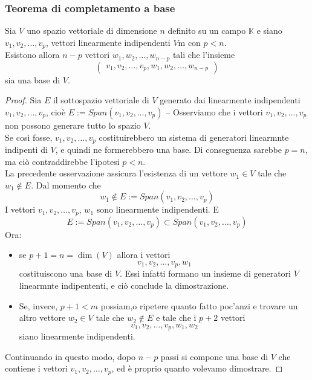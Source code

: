 \subsubsection{Teorema di completamento a base}
\label{sssec:teodicomabase}
\begin{teorema}
  Sia $V$ uno spazio vettoriale di dimensione $n$ definito su un campo $\mathbb{K}$ e siano $v_1,v_2,\dots,v_p$,
  vettori linearmente indipendenti $V$m con $p<n$.\\
  Esistono allora $n-p$ vettori $w_1,w_2,\dots,w_{n-p}$ tali che l'insieme
  \begin{equation*}
    \begin{pmatrix}
      v_1,v_2,\dots,v_p,w_1,w_2,\dots,w_{n-p}
    \end{pmatrix}
  \end{equation*}
  sia una base di $V$.
\end{teorema}
\begin{proof}
  Sia $E$ il sottospazio vettoriale di $V$ generato dai linearmente indipendenti $v_1,v_2,\dots,v_p$, cioè
  $E:=Span(v_1,v_2,\dots,v_p)$ -- Osserviamo che i vettori $v_1,v_2,\dots,v_p$ non possono generare tutto lo
  spazio $V$.\\
  Se così fosse, $v_1,v_2,\dots,v_p$ costituirebbero un sistema di generatori linearmnte indipenti di $V$, e
  quindi ne formerebbero una base. Di conseguenza sarebbe $p=n$, ma ciò contraddirebbe l'ipotesi $p<n$.\\
  La precedente osservazione assicura l'esistenza di un vettore $w_1\in V$ tale che $w_1\notin E$. Dal momento
  che
  \begin{equation*}
    w_1\notin E:=Span(v_1,v_2,\dots,v_p)
  \end{equation*}
  I vettori $v_1,v_2,\dots,v_p$, $w_1$ sono linearmente indipendenti. E
  \begin{equation*}
    E:=Span(v_1,v_2,\dots,v_p) \subset Span(v_1,v_2,\dots,v_p)
  \end{equation*}
  Ora:
  \begin{itemize}
  \item se $p+1=n=\dim (V)$ allora i vettori
    \begin{equation*}
      v_1,v_2,\dots,v_p,w_1
    \end{equation*}
    costituiscono una base di $V$. Essi infatti formano un insieme di generatori $V$ linearmnte indipententi, e
    ciò conclude la dimostrazione.
  \item Se, invece, $p+1<m$ possiam,o ripetere quanto fatto poc'anzi e trovare un altro vettore $w_2\in V$
    tale che $w_2\notin E$ e tale che i $p+2$ vettori
    \begin{equation*}
      v_1,v_2,\dots,v_p,w_1,w_2
    \end{equation*}
    siano linearmente indipendenti.
  \end{itemize}
  Continuando in questo modo, dopo $n-p$ passi si compone una base di $V$ che contiene i vettori
  $v_1,v_2,\dots,v_p$, ed è proprio quanto volevamo dimostrare.
\end{proof}
